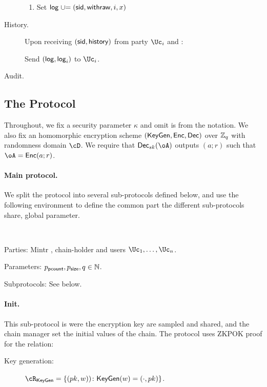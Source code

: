 \begin{functionality}
\begin{description}
\begin{enumerate}
			
			\item Set $\mathsf{log} \mathrel{\cup}= {(\mathsf{sid},\mathsf{withraw},i,x)}$
			
			
		\end{enumerate}
		
		
		\item[History.]     Upon receiving $(\mathsf{sid},\mathsf{history})$ from  party $\Uc_i$ and \Cc:  
		
		Send $(\mathsf{log},\mathsf{log}_i)$ to  $\Uc_i$.	 
		
		\item[Audit.]      
		
	\end{description}

\end{functionality}


\subsection{The Protocol}\label{sec:MainProtocol:Protocol}
Throughout, we fix a security parameter $\kappa$ and omit is from the notation. We also fix an homomorphic encryption scheme $(\mathsf{KeyGen},\mathsf{Enc},\mathsf{Dec})$ over ${\mathbb Z}_q$ with randomness domain $\cD$.  We require that $\Dec_{sk}(\oA)$ outputs   $(a;r)$ such that $\oA = \Enc(a;r)$.

\paragraph{Main protocol.}
We split  the protocol into several sub-protocols defined below, and  use the  following environment to define the common part the different sub-protocols share, \eg global parameter. 

\begin{protocol}~\label{prot:ConfidentialTransactions}


	
\item[Parties:] Mintr \Mc, chain-holder \Cc and users  $\Uc_1, \ldots,\Uc_n$.

\item[Parameters:] $p_{\mathsf{pcount}},p_{\mathsf{size}},q \in {\mathbb{N}}$.

\item[Subprotocols:]  See below.
\end{protocol}


\paragraph{Init.}
This sub-protocol is were the encryption key are sampled and shared, and the chain manager \Cc set the initial values of the chain. The protocol  uses ZKPOK proof for the relation:
\begin{description}
	\item[Key generation:]    $\rKeyGen =\rKeyGenDef$.
\end{description}


